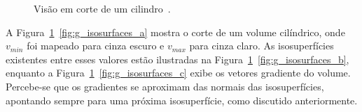 \begin{figure}[h]
	\centering
	\caption{Visão em corte de um cilindro~\cite{gordon}.}
	\label{fig:g_isosurfaces}
\end{figure}

	A Figura~\ref{fig:g_isosurfaces}~\ref{fig:g_isosurfaces_a} mostra o corte de um volume cilíndrico, onde $v_{min}$ foi mapeado para cinza escuro e $v_{max}$ para cinza claro. As isosuperfícies existentes entre esses valores estão ilustradas na Figura~\ref{fig:g_isosurfaces}~\ref{fig:g_isosurfaces_b}, enquanto a Figura~\ref{fig:g_isosurfaces}~\ref{fig:g_isosurfaces_c} exibe os vetores gradiente do volume. Percebe-se que os gradientes se aproximam das normais das isosuperfícies, apontando sempre para uma próxima isosuperfície, como discutido anteriormente.
		
